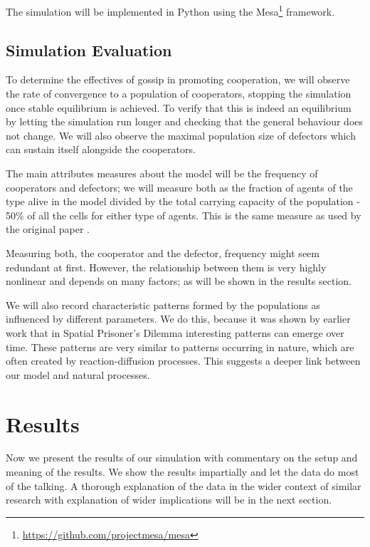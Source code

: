 \documentclass[english]{article}
\begin{document}
The simulation will be implemented in Python using the Mesa\footnote{\url{https://github.com/projectmesa/mesa}} framework.

\subsection{Simulation Evaluation}

To determine the effectives of gossip in promoting cooperation, we will observe the rate of convergence to a population of cooperators, stopping the simulation once stable equilibrium is achieved.
To verify that this is indeed an equilibrium by letting the simulation run longer and checking that the general behaviour does not change.
We will also observe the maximal population size of defectors which can sustain itself alongside the cooperators.

The main attributes measures about the model will be the frequency of cooperators and defectors;
we will measure both as the fraction of agents of the type alive in the model divided by the total carrying capacity of the population - 50\% of all the cells for either type of agents.
This is the same measure as used by the original paper \citep{smaldino}.

Measuring both, the cooperator and the defector, frequency might seem redundant at first. However, the relationship between them is very highly nonlinear and depends on many factors;
as will be shown in the results section.

We will also record characteristic patterns formed by the populations as influenced by different parameters.
We do this, because it was shown by earlier work \citep{spatial-patterns} that in Spatial Prisoner's Dilemma interesting patterns can emerge over time.
These patterns are very similar to patterns occurring in nature, which are often created by reaction-diffusion processes.
This suggests a deeper link between our model and natural processes.



\section{Results}
Now we present the results of our simulation
with commentary on the setup and meaning of the results.
We show the results impartially and let the data do most of the talking.
A thorough explanation of the data in the wider context of similar research
with explanation of wider implications will be in the next section.
\end{document}
